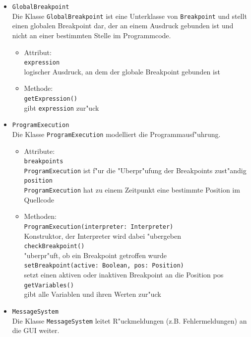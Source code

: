 \documentclass[10pt,a4paper,titlepage]{article}
\begin{document}
\begin{itemize}
\item \texttt{GlobalBreakpoint} \\
Die Klasse \texttt{GlobalBreakpoint} ist eine Unterklasse von \texttt{Breakpoint} und stellt einen globalen Breakpoint dar, der an einem Ausdruck gebunden ist und nicht an einer bestimmten Stelle im Programmcode. 
\begin{itemize}
\item Attribut: \\
\texttt{expression} \\
logischer Ausdruck, an dem der globale Breakpoint gebunden ist
\item Methode: \\
\texttt{getExpression()} \\
gibt \texttt{expression} zur"uck 
\end{itemize}
\item \texttt{ProgramExecution} \\
Die Klasse \texttt{ProgramExecution} modelliert die Programmausf"uhrung.
\begin{itemize}
\item Attribute: \\
\texttt{breakpoints} \\
\texttt{ProgramExecution} ist f"ur die "Uberpr"ufung der Breakpoints zust"andig \\
\texttt{position} \\
\texttt{ProgramExecution} hat zu einem Zeitpunkt eine bestimmte Position im Quellcode 
\item Methoden: \\
\texttt{ProgramExecution(interpreter: Interpreter)} \\
Konstruktor, der Interpreter wird dabei "ubergeben \\
\texttt{checkBreakpoint()} \\
"uberpr"uft, ob ein Breakpoint getroffen wurde \\
\texttt{setBreakpoint(active: Boolean, pos: Position)} \\
setzt einen aktiven oder inaktiven Breakpoint an die Position pos \\
\texttt{getVariables()} \\
gibt alle Variablen und ihren Werten zur"uck
\end{itemize}
\item \texttt{MessageSystem} \\
Die Klasse \texttt{MessageSystem} leitet R"uckmeldungen (z.B. Fehlermeldungen) an die GUI weiter. 
\begin{itemize}

\end{itemize}
\end{itemize}
\end{document}
